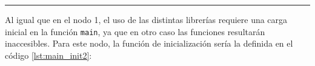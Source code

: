 
\rule{\linewidth}{.2pt}

Al igual que en el nodo 1, el uso de las distintas librerías requiere una carga inicial en
la función \texttt{main}, ya que en otro caso las funciones resultarán inaccesibles.
Para este nodo, la función de inicialización sería la definida en el código \ref{lst:main_init2}:



